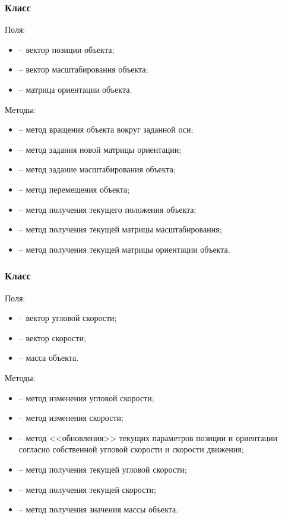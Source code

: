 \subsubsection{Класс }
\noindent\indent Поля:
\begin{itemize}
    \item {} -- вектор позиции объекта;
    \item {} -- вектор масштабирования объекта;
    \item {} -- матрица ориентации объекта.
\end{itemize}\par
    Методы:
\begin{itemize}
    \item {} -- метод вращения объекта
    вокруг заданной оси;
    \item {} -- метод задания новой матрицы
    ориентации;
    \item {} -- метод задание масштабирования объекта;
    \item {} -- метод перемещения объекта;
    \item {} -- метод получения текущего положения объекта;
    \item {} -- метод получения текущей матрицы масштабирования;
    \item {} -- метод получения текущей матрицы ориентации объекта.
\end{itemize}
\subsubsection{Класс }
\noindent\indent Поля:
\begin{itemize}
    \item {} -- вектор угловой скорости;
    \item {} -- вектор скорости;
    \item {} -- масса объекта.
\end{itemize}\par
    Методы:
\begin{itemize}
    \item {} -- метод изменения угловой скорости;
    \item {} -- метод изменения скорости;
    \item {} -- метод <<обновления>> текущих параметров позиции
    и ориентации согласно собственной угловой скорости и скорости движения;
    \item {} -- метод получения текущей угловой скорости;
    \item {} -- метод получения текущей скорости;
    \item {} -- метод получения значения массы объекта.
\end{itemize}
